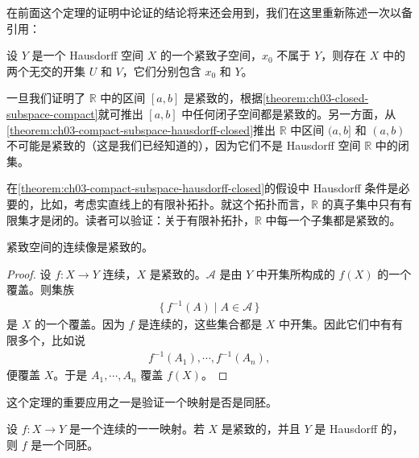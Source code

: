 在前面这个定理的证明中论证的结论将来还会用到，我们在这里重新陈述一次以备引用：

\begin{lemma}\label{lemma:ch03-separate-point-and-compact}
设 $Y$ 是一个 Hausdorff 空间 $X$ 的一个紧致子空间，$x_{0}$ 不属于 $Y$，则存在 $X$ 中的两个无交的开集 $U$ 和 $V$，它们分别包含 $x_{0}$ 和 $Y$。
\end{lemma}

\begin{example}\label{example:ch03-intervals-compact}
一旦我们证明了 $\mathbb{R}$ 中的区间 $[a,b]$ 是紧致的，根据\cref{theorem:ch03-closed-subspace-compact}就可推出 $[a,b]$ 中任何闭子空间都是紧致的。另一方面，从\cref{theorem:ch03-compact-subspace-hausdorff-closed}推出 $\mathbb{R}$ 中区间 $(a,b]$ 和 $(a,b)$ 不可能是紧致的（这是我们已经知道的），因为它们不是 Hausdorff 空间 $\mathbb{R}$ 中的闭集。
\end{example}

\begin{example}\label{example:ch03-finite-complement-compact}
在\cref{theorem:ch03-compact-subspace-hausdorff-closed}的假设中 Hausdorff 条件是必要的，比如，考虑实直线上的有限补拓扑。就这个拓扑而言，$\mathbb{R}$ 的真子集中只有有限集才是闭的。读者可以验证：关于有限补拓扑，$\mathbb{R}$ 中每一个子集都是紧致的。
\end{example}

\begin{theorem}\label{theorem:ch03-continuous-image-compact}
紧致空间的连续像是紧致的。
\end{theorem}

\begin{proof}
设 $f\colon X\to Y$ 连续，$X$ 是紧致的。$\mathcal{A}$ 是由 $Y$ 中开集所构成的 $f(X)$ 的一个覆盖。则集族
\begin{align*}
\{\,f^{-1}(A)\mid A\in\mathcal{A}\,\}
\end{align*}
是 $X$ 的一个覆盖。因为 $f$ 是连续的，这些集合都是 $X$ 中开集。因此它们中有有限多个，比如说
\begin{align*}
f^{-1}(A_{1}),\cdots,f^{-1}(A_{n}),
\end{align*}
便覆盖 $X$。于是 $A_{1},\cdots,A_{n}$ 覆盖 $f(X)$。
\end{proof}

这个定理的重要应用之一是验证一个映射是否是同胚。

\begin{theorem}\label{theorem:ch03-compact-hausdorff-homeo}
设 $f\colon X\to Y$ 是一个连续的一一映射。若 $X$ 是紧致的，并且 $Y$ 是 Hausdorff 的，则 $f$ 是一个同胚。
\end{theorem}

